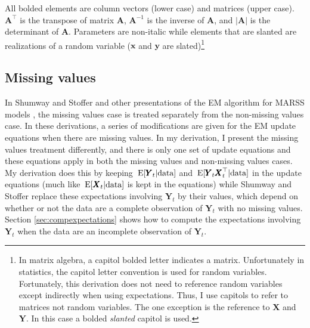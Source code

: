 \documentclass[]{article}
\def\AA{\mbox{$\mathbf A$}}	\def\aa{\mbox{$\mathbf a$}}
\def\E{\,\textup{\textrm{E}}}
\def\XX{\mbox{$\pmb{X}$}}	\def\xx{\mbox{$\pmb{x}$}}
\def\YY{\mbox{$\pmb{Y}$}}	\def\yy{\mbox{$\pmb{y}$}}
\begin{document}
All bolded elements are column vectors (lower case) and matrices (upper case).  $\AA^\top$ is the transpose of matrix $\AA$, $\AA^{-1}$ is the inverse of $\AA$, and $|\AA|$ is the determinant of $\AA$.  Parameters are non-italic while elements that are slanted are realizations of a random variable ($\xx$ and $\yy$ are slated)\footnote{In matrix algebra, a capitol bolded letter indicates a matrix.  Unfortunately in statistics, the capitol letter convention is used for random variables.  Fortunately, this derivation does not need to reference random variables except indirectly when using expectations.  Thus, I use capitols to refer to matrices not random variables.  The one exception is the reference to $\XX$ and $\YY$. In this case a bolded {\it slanted} capitol is used.}
 
\subsection{Missing values}\label{sec:missing}
In Shumway and Stoffer and other presentations of the EM algorithm for MARSS models \citep{ShumwayStoffer2006,Zuuretal2003a}, the missing values case is treated separately from the non-missing values case.  In these derivations, a series of modifications are given for the EM update equations when there are missing values.  In my derivation, I present the missing values treatment differently, and there is only one set of update equations and these equations apply in both the missing values and non-missing values cases. My derivation does this by keeping $\E[\YY_t|\text{data}]$ and $\E[\YY_t\XX_t^\top|\text{data}]$ in the update equations (much like $\E[\XX_t|\text{data}]$ is kept in the equations) while Shumway and Stoffer replace these expectations involving $\YY_t$ by their values, which depend on whether or not the data are a complete observation of $\YY_t$ with no missing values.  Section \ref{sec:compexpectations} shows how to compute the expectations involving $\YY_t$ when the data are an incomplete observation of $\YY_t$.
\end{document}
